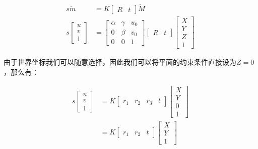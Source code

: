 \begin{equation}
  \begin{aligned}
  	s \tilde{m} &= K 
		\begin{bmatrix}
			R & t
		\end{bmatrix}
		\tilde{M} \\
	s
  	\begin{bmatrix}
  		u \\
  		v \\
  		1
  	\end{bmatrix} &= 
  	\begin{bmatrix}
  		\alpha & \gamma & u_0 \\
  		0      & \beta  & v_0 \\
  		0      & 0      & 1
  	\end{bmatrix}
  	\begin{bmatrix}
		R & t
	\end{bmatrix}
	\begin{bmatrix}
		X \\
		Y \\
		Z \\
		1
	\end{bmatrix}
  \end{aligned}
\end{equation}

由于世界坐标我们可以随意选择，因此我们可以将平面的约束条件直接设为$Z = 0$，那么有：

\begin{equation}
  \label{equ:cam}
  \begin{aligned}
	s
  	\begin{bmatrix}
  		u \\
  		v \\
  		1
  	\end{bmatrix}
  	&= K
  	\begin{bmatrix}
		r_1 & r_2 & r_3 & t
	\end{bmatrix}
	\begin{bmatrix}
		X \\
		Y \\
		0 \\
		1
	\end{bmatrix} \\
	&= K
	\begin{bmatrix}
		r_1 & r_2 & t
	\end{bmatrix}
	\begin{bmatrix}
		X \\
		Y \\
		1
	\end{bmatrix}
  \end{aligned}
\end{equation}

